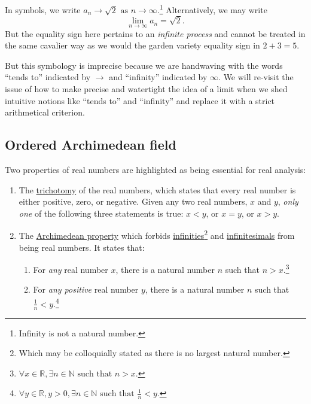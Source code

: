 \documentclass[
  a4paper,
]{article}
\providecommand{\tightlist}{%
  \setlength{\itemsep}{0pt}\setlength{\parskip}{0pt}}
\begin{document}
In symbols, we write
\(a_{n} \to \sqrt{2} \text{ as } n \to \infty\).\footnote{Infinity is
  not a natural number.} Alternatively, we may write \[
\lim_{n \to \infty}a_{n} = \sqrt{2}.
\] But the equality sign here pertains to an \emph{infinite process} and
cannot be treated in the same cavalier way as we would the garden
variety equality sign in \(2 + 3 = 5\).

But this symbology is imprecise because we are handwaving with the words
``tends to'' indicated by \(\to\) and ``infinity'' indicated by
\(\infty\). We will re-visit the issue of how to make precise and
watertight the idea of a limit when we shed intuitive notions like
``tends to'' and ``infinity'' and replace it with a strict arithmetical
criterion.

\subsection{Ordered Archimedean field}\label{ordered-archimedean-field}

Two properties of real numbers are highlighted as being essential for
real analysis:

\begin{enumerate}
\def\labelenumi{\alph{enumi}.}
\item
  The \href{https://en.wikipedia.org/wiki/Law_of_trichotomy}{trichotomy}
  of the real numbers, which states that every real number is either
  positive, zero, or negative. Given any two real numbers, \(x\) and
  \(y\), \emph{only one} of the following three statements is true:
  \(x < y\), or \(x = y\), or \(x > y\).
\item
  The \href{https://planetmath.org/archimedeanproperty}{Archimedean
  property} which forbids
  \href{https://en.wikipedia.org/wiki/Infinity}{infinities}\footnote{Which
    may be colloquially stated as there is no largest natural number.}
  and \href{https://en.wikipedia.org/wiki/Infinitesimal}{infinitesimals}
  from being real numbers. It states that:

  \begin{enumerate}
  \def\labelenumii{(\roman{enumii})}
  \tightlist
  \item
    For \emph{any} real number \(x\), there is a natural number \(n\)
    such that \(n > x\).\footnote{\(\forall x \in \mathbb{R}, \exists n \in \mathbb{N} \text{ such that } n > x.\)}
  \item
    For \emph{any positive} real number \(y\), there is a natural number
    \(n\) such that \(\frac{1}{n} < y\).\footnote{\(\forall y \in \mathbb{R}, y > 0, \exists n \in \mathbb{N} \text{ such that } \frac{1}{n} < y\).}
  \end{enumerate}
\end{enumerate}
\end{document}
